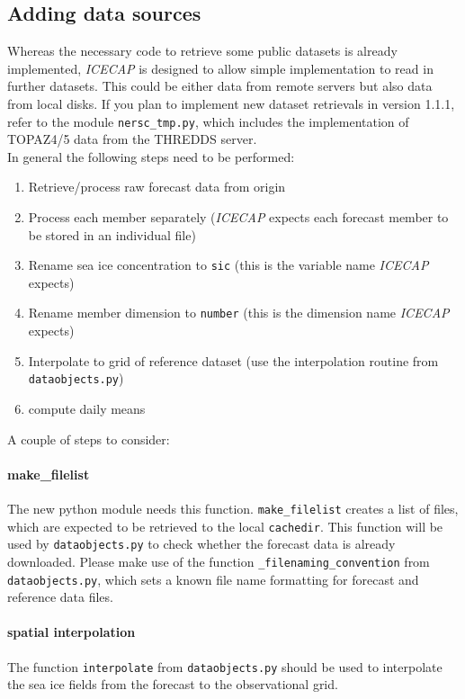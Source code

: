 \documentclass[DIV=10, parskip=full]{scrreprt}
\newcommand{\ice}{\textit{ICECAP}\xspace}
\newcommand{\version}{1.1.1\xspace}
\begin{document}
\subsection{Adding data sources}
Whereas the necessary code to retrieve some public datasets is already implemented, \ice is designed to allow simple implementation to read in further datasets. This could be either data from remote servers but also data from local disks. If you plan to implement new dataset retrievals in version \version, refer to the module \texttt{nersc\_tmp.py}, which includes the implementation of TOPAZ4/5 data from the THREDDS server. \\

In general the following steps need to be performed:
\begin{enumerate}
	\item Retrieve/process raw forecast data from origin
	\item Process each member separately (\ice expects each forecast member to be stored in an individual file)
	\item  Rename sea ice concentration to \texttt{sic} (this is the variable name \ice expects)
	\item Rename member dimension to \texttt{number} (this is the dimension name \ice expects)
	\item Interpolate to grid of reference dataset (use the interpolation routine from \texttt{dataobjects.py})
	\item compute daily means
\end{enumerate}

A couple of steps to consider: 

\paragraph{make\_filelist}
The new python module needs this function. \texttt{make\_filelist} creates a list of files, which are expected to be retrieved to the local \texttt{cachedir}. This function will be used by \texttt{dataobjects.py} to check whether the forecast data is already downloaded. Please make use of the function \texttt{\_filenaming\_convention} from  \texttt{dataobjects.py}, which sets a known file name formatting for forecast and reference data files. 

\paragraph{spatial interpolation}
The function  \texttt{interpolate} from  \texttt{dataobjects.py} should be used to interpolate the sea ice fields from the forecast to the observational grid. 
\end{document}
